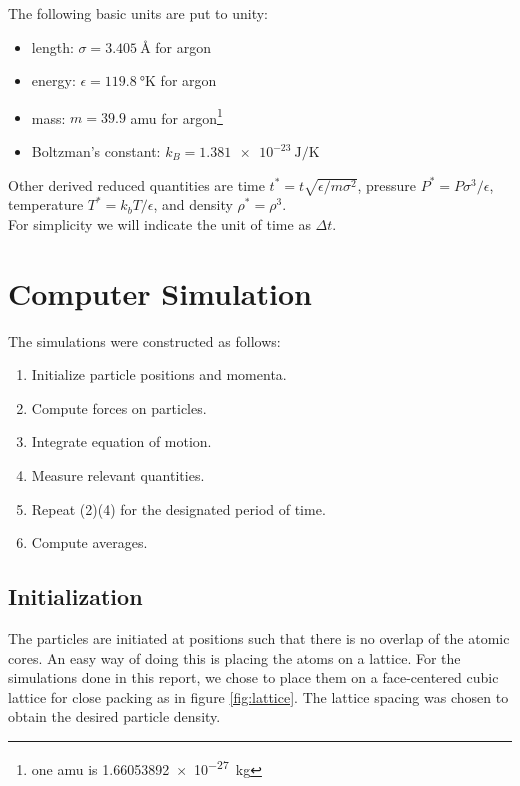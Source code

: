 \documentclass{article}
\begin{document}
The following basic units are put to unity:
\begin{center}
\begin{itemize}
 \item length: $\sigma=\SI{3.405}{\angstrom}$ for argon
 \item energy: $\epsilon=\SI{119.8}{\degree\kelvin}$ for argon
 \item mass: $m=39.9$ amu for argon\footnote{one amu is \SI{1.66053892e-27}{\kilogram}}
 \item Boltzman's constant: $k_B=\SI{1.381e-23}{\joule\per\kelvin}$
\end{itemize}
\end{center}

Other derived reduced quantities are time $t^*=t\sqrt{\epsilon/m\sigma^2}$, pressure $P^*=P\sigma^3/\epsilon$, temperature $T^*=k_bT/\epsilon$, and density $\rho^*=\rho^3$.\\

For simplicity we will indicate the unit of time as $\Delta t$.
 

\section{Computer Simulation}
The simulations were constructed as follows:
\begin{enumerate}
 \item Initialize particle positions and momenta.
 \item Compute forces on particles.
 \item Integrate equation of motion.
 \item Measure relevant quantities.
 \item Repeat (2)\text{-}(4) for the designated period of time.
 \item Compute averages.
\end{enumerate}

\subsection{Initialization}
The particles are initiated at positions such that there is no overlap of the atomic cores. An easy way of doing this is placing the atoms on a lattice. For the simulations done in this report, we chose to place them on a face-centered cubic lattice for close packing as in figure \ref{fig:lattice}. The lattice spacing was chosen to obtain the desired particle density. 
\end{document}
